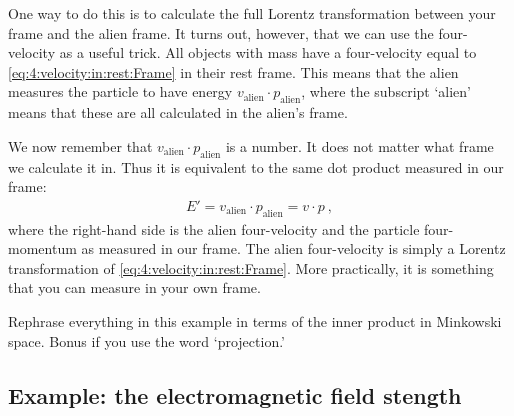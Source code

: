 \documentclass[12pt]{article}
\begin{document}
One way to do this is to calculate the full Lorentz transformation between your frame and the alien frame. It turns out, however, that we can use the four-velocity as a useful trick. All objects with mass have a four-velocity equal to \eqref{eq:4:velocity:in:rest:Frame} in their rest frame. This means that the alien measures the particle to have energy $v_\text{alien}\cdot p_\text{alien}$, where the subscript `alien' means that these are all calculated in the alien's frame.

We now remember that $v_\text{alien}\cdot p_\text{alien}$ is a number. It does not matter what frame we calculate it in. Thus it is equivalent to the same dot product measured in our frame:
\begin{align}
E'=
    v_\text{alien}\cdot p_\text{alien} = v\cdot p \ ,
\end{align}
where the right-hand side is the alien four-velocity and the particle four-momentum as measured in our frame. The alien four-velocity is simply a Lorentz transformation of \eqref{eq:4:velocity:in:rest:Frame}. More practically, it is something that you can measure in your own frame. 


\begin{exercise}
Rephrase everything in this example in terms of the inner product in Minkowski space. Bonus if you use the word `projection.'
\end{exercise}




\subsection{Example: the electromagnetic field stength}
\end{document}
